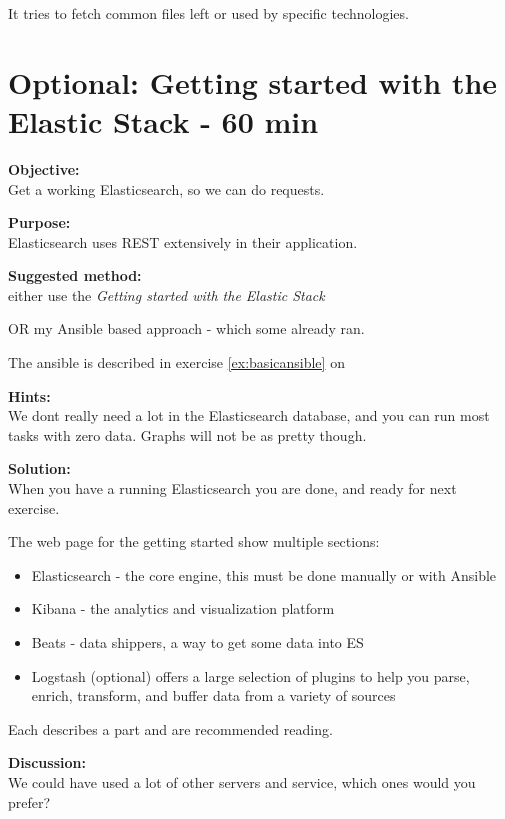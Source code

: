 \documentclass[a4paper,11pt,notitlepage]{report}
\begin{document}
It tries to fetch common files left or used by specific technologies.






\chapter{Optional: Getting started with the Elastic Stack - 60 min}
\label{ex:dateformats}


{\bf Objective:}\\
Get a working Elasticsearch, so we can do requests.

{\bf Purpose:}\\
Elasticsearch uses REST extensively in their application.

{\bf Suggested method:}\\
either use the
\emph{Getting started with the Elastic Stack}

OR my Ansible based approach - which some already ran.

The ansible is described in exercise \ref{ex:basicansible} on \pageref{ex:basicansible}

{\bf Hints:}\\
We dont really need a lot in the Elasticsearch database, and you can run most tasks with zero data. Graphs will not be as pretty though.

{\bf Solution:}\\
When you have a running Elasticsearch you are done, and ready for next exercise.

The web page for the getting started show multiple sections:
\begin{itemize}
\item Elasticsearch - the core engine, this must be done manually or with Ansible
\item Kibana - the analytics and visualization platform
\item Beats - data shippers, a way to get some data into ES
\item Logstash (optional) offers a large selection of plugins to help you parse, enrich, transform, and buffer data from a variety of sources
\end{itemize}

Each describes a part and are recommended reading.

{\bf Discussion:}\\
We could have used a lot of other servers and service, which ones would you prefer?
\end{document}
